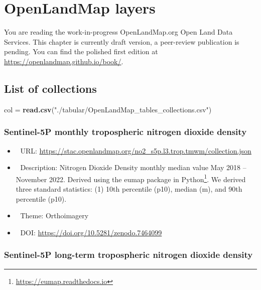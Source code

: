 \documentclass[
  graybox,natbib,nospthms]{svmono}
\newenvironment{Shaded}{\begin{snugshade}}{\end{snugshade}}
\newcommand{\FunctionTok}[1]{\textcolor[rgb]{0.27,0.27,0.27}{\textbf{#1}}}
\newcommand{\NormalTok}[1]{#1}
\newcommand{\OtherTok}[1]{\textcolor[rgb]{0.37,0.37,0.37}{#1}}
\newcommand{\StringTok}[1]{\textcolor[rgb]{0.5,0.5,0.5}{#1}}
\providecommand{\tightlist}{%
  \setlength{\itemsep}{0pt}\setlength{\parskip}{0pt}}
\providecommand{\tightlist}{\setlength{\itemsep}{0pt}\setlength{\parskip}{0pt}}
\renewcommand{\href}[2]{#2 (\url{#1})}
\renewcommand{\href}[2]{#2\footnote{\url{#1}}}
\begin{document}
\hypertarget{openlandmap-layers}{%
\chapter{OpenLandMap layers}\label{openlandmap-layers}}

You are reading the work-in-progress OpenLandMap.org Open Land Data Services. This chapter is currently draft version, a peer-review publication is pending. You can find the polished first edition at \url{https://openlandmap.github.io/book/}.

\hypertarget{list-of-collections}{%
\section{List of collections}\label{list-of-collections}}

\begin{Shaded}
\begin{Highlighting}[]
\NormalTok{col }\OtherTok{=} \FunctionTok{read.csv}\NormalTok{(}\StringTok{"./tabular/OpenLandMap\_tables\_collections.csv"}\NormalTok{)}
\end{Highlighting}
\end{Shaded}

\hypertarget{sentinel-5p-monthly-tropospheric-nitrogen-dioxide-density}{%
\subsection{Sentinel-5P monthly tropospheric nitrogen dioxide density}\label{sentinel-5p-monthly-tropospheric-nitrogen-dioxide-density}}

\begin{itemize}
\tightlist
\item
  🔗 URL: \url{https://stac.openlandmap.org/no2_s5p.l3.trop.tmwm/collection.json}
\item
  📰 Description: Nitrogen Dioxide Density monthly median value May 2018 -- November 2022. Derived using the \href{https://eumap.readthedocs.io}{eumap package in Python}. We derived three standard statistics: (1) 10th percentile (p10), median (m), and 90th percentile (p10).
\item
  📝 Theme: Orthoimagery
\item
  📂 DOI: \url{https://doi.org/10.5281/zenodo.7464099}
\end{itemize}

\hypertarget{sentinel-5p-long-term-tropospheric-nitrogen-dioxide-density}{%
\subsection{Sentinel-5P long-term tropospheric nitrogen dioxide density}\label{sentinel-5p-long-term-tropospheric-nitrogen-dioxide-density}}
\end{document}
